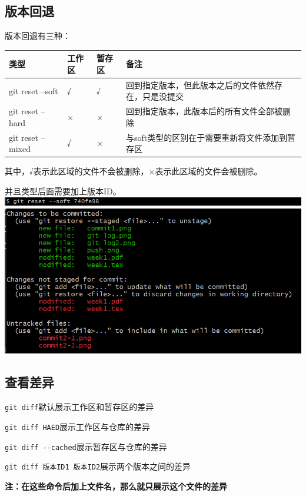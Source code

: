 \documentclass[UTF8,a4paper]{ctexart}
\begin{document}
\subsection{版本回退}
版本回退有三种：\par
\begin{table}[H]
    \centering
    \begin{tabular}{|>{\centering\arraybackslash}p{3cm}|>{\centering\arraybackslash}p{1.5cm}|>{\centering\arraybackslash}p{1.5cm}|>{\centering\arraybackslash}p{5cm}|}
        \hline
        类型 & 工作区 & 暂存区 & 备注\\
        \hline
        git reset --soft & √ & √ & 回到指定版本，但此版本之后的文件依然存在，只是没提交\\
        \hline
        git reset --hard & × & × & 回到指定版本，此版本后的所有文件全部被删除\\
        \hline
        git reset --mixed & √ & × & 与soft类型的区别在于需要重新将文件添加到暂存区\\
        \hline
    \end{tabular}
\end{table}
其中，√表示此区域的文件不会被删除，×表示此区域的文件会被删除。\par
并且类型后面需要加上版本ID。\\
\includegraphics[width=1\textwidth]{reset1.png}\\
\includegraphics[width=1\textwidth]{reset2.png}

\subsection{查看差异}
\verb|git diff|\quad 默认展示工作区和暂存区的差异\par
\verb|git diff HAED|\quad 展示工作区与仓库的差异\par
\verb|git diff --cached|\quad 展示暂存区与仓库的差异\par
\verb|git diff 版本ID1 版本ID2|\quad 展示两个版本之间的差异\par
\textbf{注：在这些命令后加上文件名，那么就只展示这个文件的差异}
\end{document}

